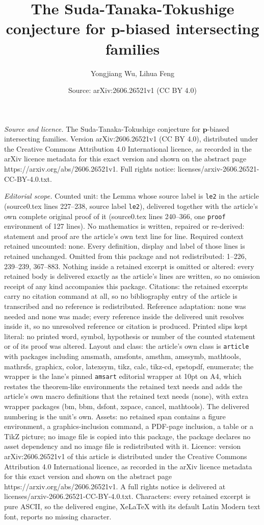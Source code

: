 \documentclass[10pt,a4paper]{amsart}
\title[The Suda-Tanaka-Tokushige conjecture for $\mathbf{p}$-biased]{The Suda-Tanaka-Tokushige conjecture for $\mathbf{p}$-biased intersecting families}
\author{Yongjiang Wu, Lihua Feng}
\date{Source: arXiv:2606.26521v1 (CC BY 4.0)}
\begin{document}
\maketitle

\noindent\emph{Source and licence.} The Suda-Tanaka-Tokushige conjecture for $\mathbf{p}$-biased intersecting families. Version arXiv:2606.26521v1 (CC BY 4.0), distributed under the Creative Commons Attribution 4.0 International licence, as recorded in the arXiv licence metadata for this exact version and shown on the abstract page https://arxiv.org/abs/2606.26521v1. Full rights notice: licenses/arxiv-2606.26521-CC-BY-4.0.txt.\par\smallskip

\noindent\textit{Editorial scope.} Counted unit: the Lemma whose source label is \texttt{le2} in the article (source0.tex lines 227--238, source label \texttt{le2}), delivered together with the article's own complete original proof of it (source0.tex lines 240--366, one \texttt{proof} environment of 127 lines). No mathematics is written, repaired or re-derived: statement and proof are the article's own text line for line. Required context retained uncounted: none. Every definition, display and label of those lines is retained unchanged. Omitted from this package and not redistributed: 1--226, 239--239, 367--883. Nothing inside a retained excerpt is omitted or altered: every retained body is delivered exactly as the article's lines are written, so no omission receipt of any kind accompanies this package. Citations: the retained excerpts carry no citation command at all, so no bibliography entry of the article is transcribed and no reference is redistributed. Reference adaptation: none was needed and none was made; every reference inside the delivered unit resolves inside it, so no unresolved reference or citation is produced. Printed slips kept literal: no printed word, symbol, hypothesis or number of the counted statement or of its proof was altered. Layout and class: the article's own class is \texttt{article} with packages including amsmath, amsfonts, amsthm, amssymb, mathtools, mathrsfs, graphicx, color, latexsym, tikz, calc, tikz-cd, epstopdf, enumerate; the wrapper is the lane's pinned \texttt{amsart} editorial wrapper at 10pt on A4, which restates the theorem-like environments the retained text needs and adds the article's own macro definitions that the retained text needs (none), with extra wrapper packages (bm, bbm, dsfont, xspace, cancel, mathtools). The delivered numbering is the unit's own. Assets: no retained span contains a figure environment, a graphics-inclusion command, a PDF-page inclusion, a table or a TikZ picture; no image file is copied into this package, the package declares no asset dependency and no image file is redistributed with it. Licence: version arXiv:2606.26521v1 of this article is distributed under the Creative Commons Attribution 4.0 International licence, as recorded in the arXiv licence metadata for this exact version and shown on the abstract page https://arxiv.org/abs/2606.26521v1. A full rights notice is delivered at licenses/arxiv-2606.26521-CC-BY-4.0.txt. Characters: every retained excerpt is pure ASCII, so the delivered engine, XeLaTeX with its default Latin Modern text font, reports no missing character.
\end{document}
